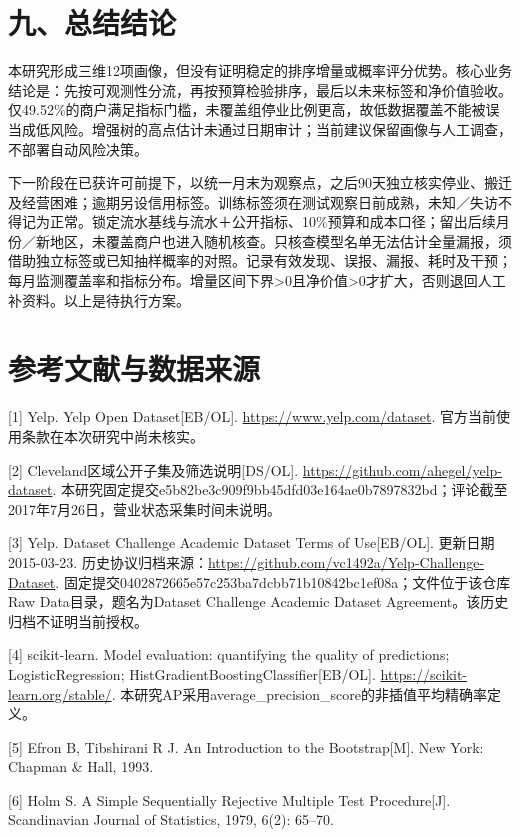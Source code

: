 \documentclass[a4paper,10pt]{article}
\begin{document}
\section*{九、总结结论}
本研究形成三维12项画像，但没有证明稳定的排序增量或概率评分优势。核心业务结论是：先按可观测性分流，再按预算检验排序，最后以未来标签和净价值验收。仅49.52\%的商户满足指标门槛，未覆盖组停业比例更高，故低数据覆盖不能被误当成低风险。增强树的高点估计未通过日期审计；当前建议保留画像与人工调查，不部署自动风险决策。

下一阶段在已获许可前提下，以统一月末为观察点，之后90天独立核实停业、搬迁及经营困难；逾期另设信用标签。训练标签须在测试观察日前成熟，未知／失访不得记为正常。锁定流水基线与流水＋公开指标、10\%预算和成本口径；留出后续月份／新地区，未覆盖商户也进入随机核查。只核查模型名单无法估计全量漏报，须借助独立标签或已知抽样概率的对照。记录有效发现、误报、漏报、耗时及干预；每月监测覆盖率和指标分布。增量区间下界>0且净价值>0才扩大，否则退回人工补资料。以上是待执行方案。


\newpage
{}
\section*{参考文献与数据来源}
[1] Yelp. Yelp Open Dataset[EB/OL]. \url{https://www.yelp.com/dataset}. 官方当前使用条款在本次研究中尚未核实。

[2] Cleveland区域公开子集及筛选说明[DS/OL]. \url{https://github.com/ahegel/yelp-dataset}. 本研究固定提交e5b82be3c909f9bb45dfd03e164ae0b7897832bd；评论截至2017年7月26日，营业状态采集时间未说明。

[3] Yelp. Dataset Challenge Academic Dataset Terms of Use[EB/OL]. 更新日期2015-03-23. 历史协议归档来源：\url{https://github.com/vc1492a/Yelp-Challenge-Dataset}. 固定提交0402872665e57c253ba7dcbb71b10842bc1ef08a；文件位于该仓库Raw Data目录，题名为Dataset Challenge Academic Dataset Agreement。该历史归档不证明当前授权。

[4] scikit-learn. Model evaluation: quantifying the quality of predictions; LogisticRegression; HistGradientBoostingClassifier[EB/OL]. \url{https://scikit-learn.org/stable/}. 本研究AP采用average\_precision\_score的非插值平均精确率定义。

[5] Efron B, Tibshirani R J. An Introduction to the Bootstrap[M]. New York: Chapman \& Hall, 1993.

[6] Holm S. A Simple Sequentially Rejective Multiple Test Procedure[J]. Scandinavian Journal of Statistics, 1979, 6(2): 65–70.
\end{document}
